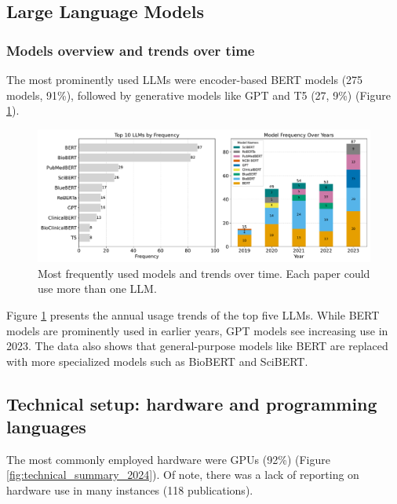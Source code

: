 \documentclass[fleqn,10pt]{olplainarticle}
\begin{document}
\subsection*{Large Language Models}

\subsubsection*{Models overview and trends over time}

The most prominently used LLMs were encoder-based BERT models (275 models, 91\%), followed by generative models like GPT and T5 (27, 9\%) (Figure \ref{fig:llms_overview_and_time_trends}).

\begin{figure}[!ht]
\begin{center}
\includegraphics[scale=0.4]{visuals/new_pdf/LLM_models_and_time_trend_2024.pdf} %
\caption{Most frequently used models and trends over time. Each paper could use more than one LLM.}
\label{fig:llms_overview_and_time_trends}
\end{center}
\end{figure}

Figure \ref{fig:llms_overview_and_time_trends} presents the annual usage trends of the top five LLMs. While BERT models are prominently used in earlier years, GPT models see increasing use in 2023. The data also shows that general-purpose models like BERT are replaced with more specialized models such as BioBERT and SciBERT.


\subsection*{Technical setup: hardware and programming languages}
The most commonly employed hardware were GPUs (92\%) (Figure \ref{fig:technical_summary_2024}). Of note, there was a lack of reporting on hardware use in many instances (118 publications).
\end{document}
